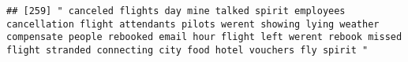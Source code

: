 \documentclass[
]{article}
\begin{document}
\begin{verbatim}
## [259] " canceled flights day mine talked spirit employees cancellation flight attendants pilots werent showing lying weather compensate people rebooked email hour flight left werent rebook missed flight stranded connecting city food hotel vouchers fly spirit "                                                                                                                                                                                                                                                                                                                                                                                                                                                                                                                                                                                                                                                                                                                                                                                                                                                                                                                                                                                                                                                                                                                                                                                                                                                                                                                                                                                                                                                                                                                                  

\end{verbatim}
\end{document}
